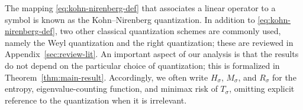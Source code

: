 \documentclass[a4paper,12pt]{article}
\newcommand{\symbolnot}{\sigma}
\begin{document}
The mapping \eqref{eq:kohn-nirenberg-def} that associates a linear operator to a
symbol is known as the Kohn--Nirenberg quantization.
In addition to \eqref{eq:kohn-nirenberg-def}, two other classical quantization
schemes are commonly used, namely the Weyl quantization and the right
quantization; these are reviewed in Appendix~\ref{sec:review-lit}.
An important aspect of our analysis is that the results do not depend on the
particular choice of quantization; this is formalized in
Theorem~\ref{thm:main-result}.
Accordingly, we often write $H_\sigma$, $M_\sigma$, and $R_\sigma$ for the %
entropy, eigenvalue-counting function, and minimax risk of $T_\sigma$, omitting
explicit reference to the quantization when it is irrelevant.

\end{document}
